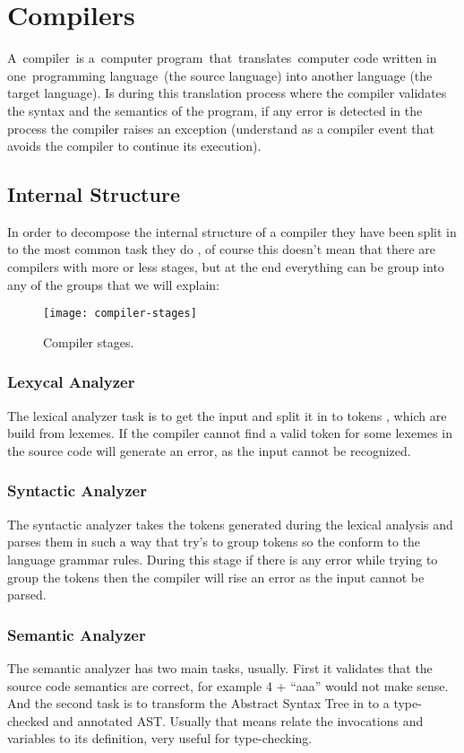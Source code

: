 \section{Compilers}
A compiler is a computer program that translates computer code written in one programming language (the source language) into another language (the target language). Is during this translation process where the compiler validates the syntax and the semantics of the program, if any error is detected in the process the compiler raises an exception (understand as a compiler event that avoids the compiler to continue its execution).

\subsection{Internal Structure}
In order to decompose the internal structure of a compiler they have been split in to the most common task they do , of course this doesn’t mean that there are compilers with more or less stages, but at the end everything can be group into any of the groups that we will explain:

\begin{figure}[hb]
  \texttt{[image: compiler-stages]}
  \caption[Compiler stages]{Compiler stages.}
\end{figure}

\subsubsection{Lexycal Analyzer}
The lexical analyzer task is to get the input and split it in to tokens , which are build from lexemes. If the compiler cannot find a valid token for some lexemes in the source code will generate an error, as the input cannot be recognized.

\subsubsection{Syntactic Analyzer}
The syntactic analyzer takes the tokens generated during the lexical analysis and parses them in such a way that try’s to group tokens so the conform to the language grammar rules. During this stage if there is any error while trying to group the tokens then the compiler will rise an error as the input cannot be parsed.

\subsubsection{Semantic Analyzer}
The semantic analyzer has two main tasks, usually. First it validates that the source code semantics are correct, for example 4 + “aaa” would not make sense. And the second task is to transform the Abstract Syntax Tree in to a type-checked and annotated AST. Usually that means relate the invocations and variables to its definition, very useful for type-checking.

